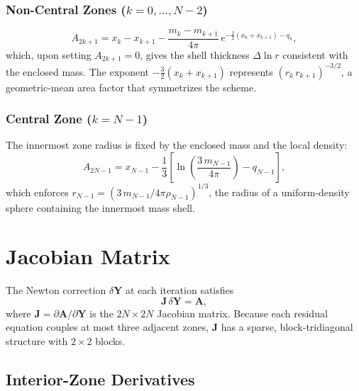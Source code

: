 \documentclass{aastex631}
\newcommand{\pp}{\partial}
\begin{document}
\subsubsection{Non-Central Zones ($k = 0,\ldots,N-2$)}

\begin{equation}\label{eq:radius_eq}
  A_{2k+1} = x_k - x_{k+1}
            - \frac{m_k - m_{k+1}}{4\pi}\,
              e^{-\frac{3}{2}(x_k + x_{k+1}) - q_k},
\end{equation}
which, upon setting $A_{2k+1}=0$, gives the shell thickness
$\Delta\ln r$ consistent with the enclosed mass.  The exponent
$-\tfrac{3}{2}(x_k + x_{k+1})$ represents $(r_k\,r_{k+1})^{-3/2}$, a
geometric-mean area factor that symmetrizes the scheme.

\subsubsection{Central Zone ($k=N-1$)}

The innermost zone radius is fixed by the enclosed mass and
the local density:
\begin{equation}\label{eq:radius_center}
  A_{2N-1} = x_{N-1}
            - \frac{1}{3}\!\left[\ln\!\left(\frac{3\,m_{N-1}}{4\pi}\right)
              - q_{N-1}\right],
\end{equation}
which enforces $r_{N-1} = (3\,m_{N-1} / 4\pi\rho_{N-1})^{1/3}$, the
radius of a uniform-density sphere containing the innermost mass shell.

\section{Jacobian Matrix}\label{sec:jacobian}

The Newton correction $\delta\mathbf{Y}$ at each iteration satisfies
\begin{equation}\label{eq:newton}
  \mathbf{J}\,\delta\mathbf{Y} = \mathbf{A},
\end{equation}
where $\mathbf{J} = \pp\mathbf{A}/\pp\mathbf{Y}$ is the $2N\times 2N$
Jacobian matrix.  Because each residual equation couples at most three
adjacent zones, $\mathbf{J}$ has a sparse, block-tridiagonal structure
with $2\times 2$ blocks.

\subsection{Interior-Zone Derivatives}
\end{document}
